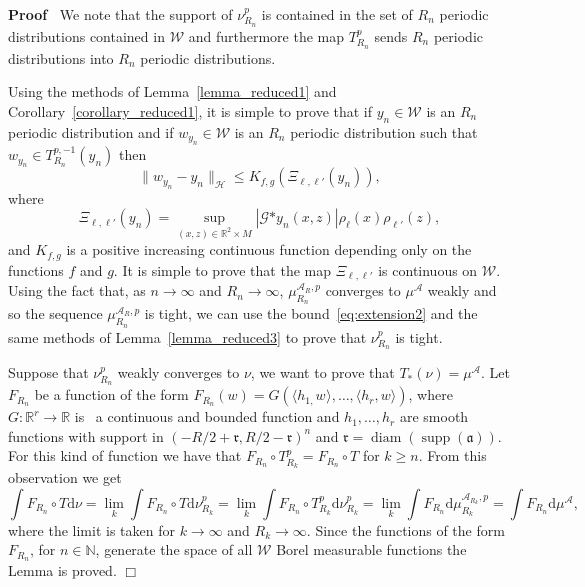 \documentclass[a4paper,10pt]{article}
\newcommand{\asterisk}{\mathord{*}}
\newcommand{\mathd}{\mathrm{d}}
\newcommand{\tmop}[1]{\ensuremath{\operatorname{#1}}}
\newenvironment{proof}{\noindent\textbf{Proof\ }}{\hspace*{\fill}$\Box$\medskip}
\begin{document}
\begin{proof}
  We note that the support of $\nu_{R_n}^p$ is contained in the set of $R_n$
  periodic distributions contained in $\mathcal{W}$ and furthermore the map
  $T_{R_n}^p$ sends $R_n$ periodic distributions into $R_n$ periodic
  distributions.
  
  Using the methods of Lemma~\ref{lemma_reduced1} and
  Corollary~\ref{corollary_reduced1}, it is simple to prove that if $y_n \in
  \mathcal{W}$ is an $R_n$ periodic distribution and if $w_{y_n} \in
  \mathcal{W}$ is an $R_n$ periodic distribution such that $w_{y_n} \in T^{p,
  - 1}_{R_n} (y_n)$ then
  \begin{equation}
    \| w_{y_n} - y_n \|_{\mathcal{H}} \leqslant K_{f, g} (\Xi_{\ell, \ell'}
    (y_n)), \label{eq:extension2}
  \end{equation}
  where
  \[ \Xi_{\ell, \ell'} (y_n) = \sup_{(x, z) \in \mathbb{R}^2 \times M} |
     \mathcal{G} \asterisk y_n (x, z) | \rho_{\ell} (x) \rho_{\ell'} (z), \]
  and $K_{f, g}$ is a positive increasing continuous function depending only
  on the functions $f$ and $g$. It is simple to prove that the map $\Xi_{\ell,
  \ell'}$ is continuous on $\mathcal{W}$. Using the fact that, as $n
  \rightarrow \infty$ and $R_n \rightarrow \infty$, $\mu^{\mathcal{A}_R,
  p}_{R_n}$ converges to $\mu^{\mathcal{A}}$ weakly and so the sequence
  $\mu^{\mathcal{A}_R, p}_{R_n}$ is tight, we can use the
  bound~{\eqref{eq:extension2}} and the same methods of
  Lemma~\ref{lemma_reduced3} to prove that $\nu_{R_n}^p$ is tight.
  
  Suppose that $\nu_{R_n}^p$ weakly converges to $\nu$, we want to prove that
  $T_{\asterisk} (\nu) = \mu^{\mathcal{A}}$. Let $F_{R_n}$ be a function of
  the form $F_{R_n} (w) = G (\langle h_{1,} w_{} \rangle, \ldots, \langle h_r,
  w \rangle)$, where $G : \mathbb{R}^r \rightarrow \mathbb{R}$ is \ a
  continuous and bounded function and $h_1, \ldots, h_r$ are smooth functions
  with support in $(- R / 2 + \mathfrak{r}, R / 2 - \mathfrak{r})^n$ and
  $\mathfrak{r} = \tmop{diam} (\tmop{supp} (\mathfrak{a}))$. For this kind of
  function we have that $F_{R_n} \circ T_{R_k}^p = F_{R_n} \circ T$ for $k
  \geqslant n$. From this observation we get
  \[ \int F_{R_n} \circ T \mathd \nu = \lim_k \int F_{R_n} \circ T \mathd
     \nu_{R_k}^p = \lim_k \int F_{R_n} \circ T_{R_k}^p \mathd \nu_{R_k}^p =
     \lim_k \int F_{R_n} \mathd \mu^{\mathcal{A}_{R_k}, p}_{R_k} = \int
     F_{R_n} \mathd \mu^{\mathcal{A}}, \]
  where the limit is taken for $k \rightarrow \infty$ and $R_k \rightarrow
  \infty$. Since the functions of the form $F_{R_n}$, for $n \in \mathbb{N}$,
  generate the space of all $\mathcal{W}$ Borel measurable functions the Lemma
  is proved.
\end{proof}
\end{document}
